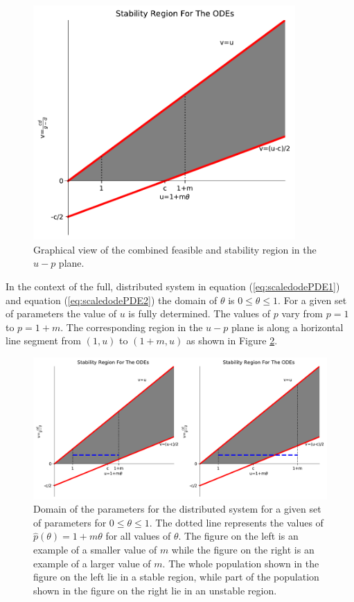 \documentclass[12pt]{article}
\begin{document}
\begin{figure}[htb]
  \centering
  \includegraphics[width=10cm]{img/odeStability-uv-plane.pdf}
  \caption[Stability region in the $u-p$ plane.]{Graphical view of the
    combined feasible and stability region in the $u-p$ plane.}
  \label{fig:uvStabilityRegion}
\end{figure}

In the context of the full, distributed system in equation
(\ref{eq:scaledodePDE1}) and equation (\ref{eq:scaledodePDE2}) the
domain of $\theta$ is $0\leq\theta\leq 1$. For a given set of
parameters the value of $u$ is fully determined. The values of $p$
vary from $p=1$ to $p=1+m$.  The corresponding region in the $u-p$
plane is along a horizontal line segment from $(1,u)$ to
$(1+m,u)$ as shown in Figure \ref{fig:distributedLineSegment}.

\begin{figure}[htb]
  \centering
  \includegraphics[width=12cm]{img/odeStability-uv-plane-Line.pdf}
  \caption[Domain of the distributed system in the $u-p$
  plane.]{Domain of the parameters for the distributed system for a
    given set of parameters for $0\leq\theta\leq 1$. The dotted line
    represents the values of $\hat{p}(\theta)=1+m\theta$ for all
    values of $\theta$. The figure on the left is an example of a
    smaller value of $m$ while the figure on the right is an example
    of a larger value of $m$. The whole population shown in the figure
    on the left lie in a stable region, while part of the population
    shown in the figure on the right lie in an unstable region.}
  \label{fig:distributedLineSegment}
\end{figure}
\end{document}
